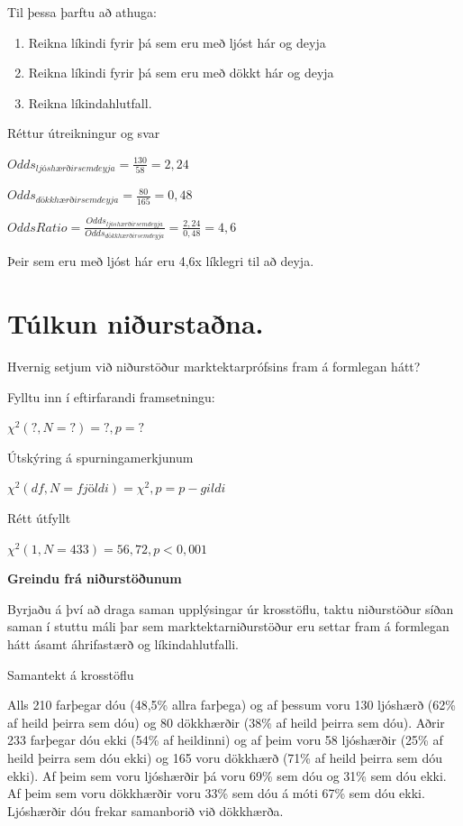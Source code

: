 \documentclass[
]{book}
\providecommand{\tightlist}{%
  \setlength{\itemsep}{0pt}\setlength{\parskip}{0pt}}
\begin{document}
Til þessa þarftu að athuga:

\begin{enumerate}
\def\labelenumi{\arabic{enumi}.}
\tightlist
\item
  Reikna líkindi fyrir þá sem eru með ljóst hár og deyja
\item
  Reikna líkindi fyrir þá sem eru með dökkt hár og deyja
\item
  Reikna líkindahlutfall.
\end{enumerate}

Réttur útreikningur og svar

\(Odds_{ljóshærðir sem deyja} = \frac{130}{58} = 2,24\)

\(Odds_{dökkhærðir sem deyja} = \frac{80}{165} = 0,48\)

\(OddsRatio = \frac{Odds_{ljóshærðir sem deyja}}{Odds_{dökkhærðir sem deyja}} = \frac{2,24}{0,48} = 4,6\)

Þeir sem eru með ljóst hár eru 4,6x líklegri til að deyja.

\hypertarget{tuxfalkun-niuxf0urstauxf0na.}{%
\section{Túlkun niðurstaðna.}\label{tuxfalkun-niuxf0urstauxf0na.}}

Hvernig setjum við niðurstöður marktektarprófsins fram á formlegan hátt?

Fylltu inn í eftirfarandi framsetningu:

\({\chi}^2 (?, N = ?) = ?, p = ?\)

Útskýring á spurningamerkjunum

\({\chi}^2 (df, N = fjöldi) = {\chi}^2, p = p-gildi\)

Rétt útfyllt

\({\chi}^2 (1, N = 433) = 56,72, p < 0,001\)

\textbf{Greindu frá niðurstöðunum}

Byrjaðu á því að draga saman upplýsingar úr krosstöflu, taktu niðurstöður síðan saman í stuttu máli þar sem marktektarniðurstöður eru settar fram á formlegan hátt ásamt áhrifastærð og líkindahlutfalli.

Samantekt á krosstöflu

Alls 210 farþegar dóu (48,5\% allra farþega) og af þessum voru 130 ljóshærð (62\% af heild þeirra sem dóu) og 80 dökkhærðir (38\% af heild þeirra sem dóu). Aðrir 233 farþegar dóu ekki (54\% af heildinni) og af þeim voru 58 ljóshærðir (25\% af heild þeirra sem dóu ekki) og 165 voru dökkhærð (71\% af heild þeirra sem dóu ekki). Af þeim sem voru ljóshærðir þá voru 69\% sem dóu og 31\% sem dóu ekki. Af þeim sem voru dökkhærðir voru 33\% sem dóu á móti 67\% sem dóu ekki. Ljóshærðir dóu frekar samanborið við dökkhærða.
\end{document}

